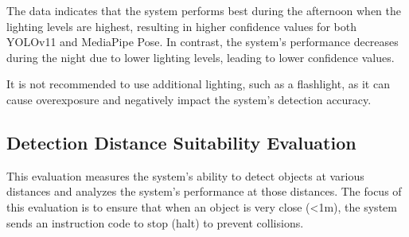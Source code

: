 The data indicates that the system performs best during the afternoon when the lighting levels are highest, resulting in higher confidence values for both YOLOv11 and MediaPipe Pose. In contrast, the system's performance decreases during the night due to lower lighting levels, leading to lower confidence values.

It is not recommended to use additional lighting, such as a flashlight, as it can cause overexposure and negatively impact the system's detection accuracy.

\subsection{Detection Distance Suitability Evaluation}
\label{subsec:detectiondistancesuitabilityevaluation}

This evaluation measures the system's ability to detect objects at various distances and analyzes the system's performance at those distances. The focus of this evaluation is to ensure that when an object is very close (\textless 1m), the system sends an instruction code to stop (halt) to prevent collisions.

